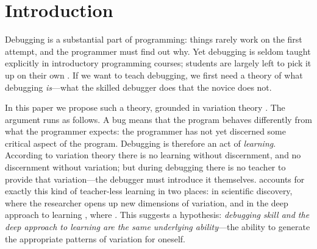 \mode*
\section{Introduction}

Debugging is a substantial part of programming: things rarely work on the
first attempt, and the programmer must find out why.
Yet debugging is seldom taught explicitly in introductory programming courses;
students are largely left to pick it up on their own
\autocite[For a review of debugging in computing education, see][]{DebuggingReview}.
If we want to teach debugging, we first need a theory of what debugging
\emph{is}---what the skilled debugger does that the novice does not.


In this paper we propose such a theory, grounded in variation theory
\autocite{NCOL}.
The argument runs as follows.
A bug means that the program behaves differently from what the programmer
expects: the programmer has not yet discerned some critical aspect of the
program.
Debugging is therefore an act of \emph{learning}.
According to variation theory there is no learning without discernment, and no
discernment without variation; but during debugging there is no teacher to
provide that variation---the debugger must introduce it themselves.
\Textcite[Ch.~5]{NCOL} accounts for exactly this kind of teacher-less learning
in two places: in scientific discovery, where the researcher opens up new dimensions
of variation, and in the deep approach to learning
\autocite{MartonSaljo1976I}, where
.
This suggests a hypothesis: \emph{debugging skill and the deep approach to
learning are the same underlying ability}---the ability to generate the
appropriate patterns of variation for oneself.

